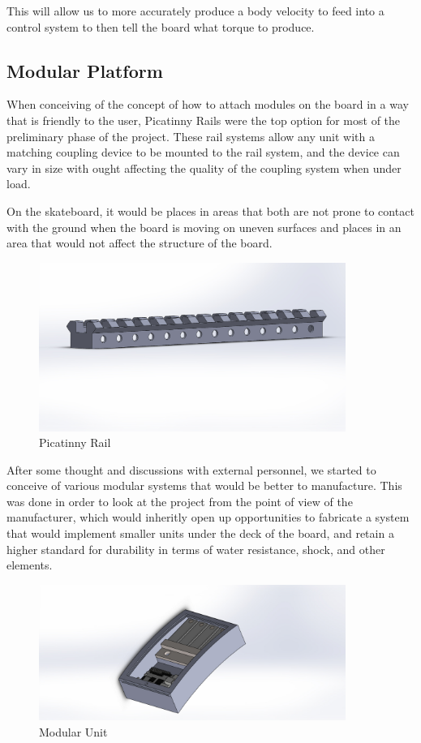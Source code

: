 \documentclass[titlepage, letterpaper,12pt]{article}
\begin{document}
This will allow us to more accurately produce a body velocity to feed into a control system to then tell the board what torque to produce.

\subsection{Modular Platform}
When conceiving of the concept of how to attach modules on the board in a way that is friendly to the user, Picatinny Rails were the top option for most of the preliminary phase of the project. These rail systems allow any unit with a matching coupling device to be mounted to the rail system, and the device can vary in size with ought affecting the quality of the coupling system when under load.

On the skateboard, it would be places in areas that both are not prone to contact with the ground when the board is moving on uneven surfaces and places in an area that would not affect the structure of the board.

\begin{figure}[h]
    \centering
    \includegraphics[width=10cm]{figs/Picatinny_Rail.JPG}
    \caption{Picatinny Rail}
    \label{fig:picTiny}
\end{figure}

After some thought and discussions with external personnel, we started to conceive of various modular systems that would be better to manufacture. This was done in order to look at the project from the point of view of the manufacturer, which would inheritly open up opportunities to fabricate a system that would implement smaller units under the deck of the board, and retain a higher standard for durability in terms of water resistance, shock, and other elements.

\begin{figure}[!h]
    \centering
    \includegraphics[width=10cm]{figs/ModPieceAngle.JPG}
    \caption{Modular Unit}
    \label{fig:picTiny}
\end{figure}
\end{document}
